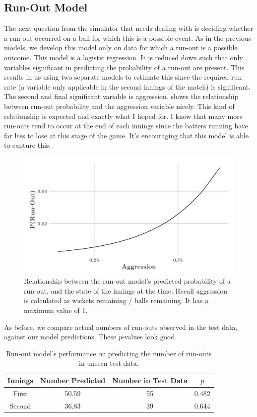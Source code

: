 \subsection{Run-Out Model}

The next question from the simulator that needs dealing with is deciding whether a run-out occurred on a ball for which this is a possible event. As in the previous models, we develop this model only on data for which a run-out is a possible outcome. This model is a logistic regression. It is reduced down such that only variables significant in predicting the probability of a run-out are present. This results in us using two separate models to estimate this since the required run rate (a variable only applicable in the second innings of the match) is significant. The second and final significant variable is aggression.  shows the relationship between run-out probability and the aggression variable nicely. This kind of relationship is expected and exactly what I hoped for. I know that many more run-outs tend to occur at the end of each innings since the batters running have far less to lose at this stage of the game. It's encouraging that this model is able to capture this.

\begin{figure}[ht]
    \centering
    \includegraphics[width=0.75\columnwidth]{images/runoutplot2.jpeg}
    \caption{Relationship between the run-out model's predicted probability of a run-out, and the state of the innings at the time. Recall aggression is calculated as wickets remaining / balls remaining. It has a maximum value of 1.}
    \label{fig: runout}
\end{figure}

As before, we compare actual numbers of run-outs observed in the test data, against our model predictions. These $p$-values look good.

\begin{table}[ht]
\vspace{0.5em}
\centering
\begin{tabular} {c c c c} \toprule
    {Innings} & {Number Predicted} & {Number in Test Data} & {$p$} \\ \midrule
     First & 50.59 & 55 & 0.482 \\
     Second & 36.83 & 39 & 0.644 \\ \bottomrule
\end{tabular}
\caption{Run-out model's performance on predicting the number of run-outs in unseen test data.}
\label{table: runouts}
\end{table}

